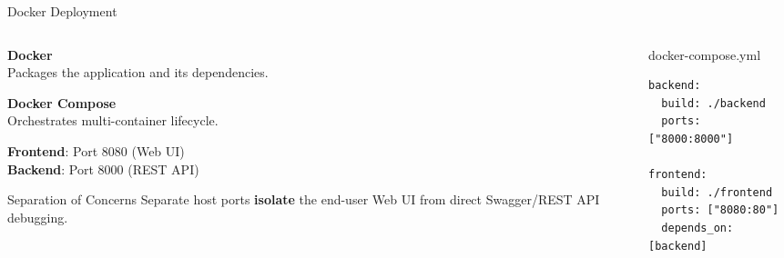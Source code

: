 \begin{frame}[fragile]{Docker Deployment}
\begin{columns}[T,onlytextwidth]
\begin{column}{0.48\textwidth}
\vspace{0.2cm}
\textbf{Docker}\\
Packages the application and its dependencies.

\vspace{0.25cm}
\textbf{Docker Compose}\\
Orchestrates multi-container lifecycle.

\vspace{0.25cm}
\textbf{Frontend}: Port 8080 (Web UI)\\
\textbf{Backend}: Port 8000 (REST API)

\vspace{0.25cm}
\begin{block}{Separation of Concerns}
\scriptsize
Separate host ports \textbf{isolate} the end-user Web UI from direct Swagger/REST API debugging.
\end{block}
\end{column}

\begin{column}{0.48\textwidth}
\vspace{0.2cm}
\begin{block}{docker-compose.yml}
\scriptsize
\begin{verbatim}
backend:
  build: ./backend
  ports: ["8000:8000"]

frontend:
  build: ./frontend
  ports: ["8080:80"]
  depends_on: [backend]
\end{verbatim}
\end{block}
\end{column}
\end{columns}
\end{frame}

